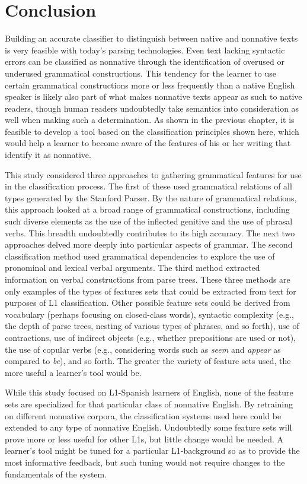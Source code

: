\documentclass[main.tex]{subfiles}
\begin{document}
\section{Conclusion}
\setcounter{section}{9}

Building an accurate classifier to distinguish between native and nonnative texts is very feasible with today's parsing technologies. Even text lacking syntactic errors can be classified as nonnative through the identification of overused or underused grammatical constructions. This tendency for the learner to use certain grammatical constructions more or less frequently than a native English speaker is likely also part of what makes nonnative texts appear as such to native readers, though human readers undoubtedly take semantics into consideration as well when making such a determination. As shown in the previous chapter, it is feasible to develop a tool based on the classification principles shown here, which would help a learner to become aware of the features of his or her writing that identify it as nonnative.

This study considered three approaches to gathering grammatical features for use in the classification process. The first of these used grammatical relations of all types generated by the Stanford Parser. By the nature of grammatical relations, this approach looked at a broad range of grammatical constructions, including such diverse elements as the use of the inflected genitive and the use of phrasal verbs. This breadth undoubtedly contributes to its high accuracy. The next two approaches delved more deeply into particular aspects of grammar. The second classification method used grammatical dependencies to explore the use of pronominal and lexical verbal arguments. The third method extracted information on verbal constructions from parse trees. These three methods are only examples of the types of features sets that could be extracted from text for purposes of L1 classification. Other possible feature sets could be derived from vocabulary (perhaps focusing on closed-class words), syntactic complexity (e.g., the depth of parse trees, nesting of various types of phrases, and so forth), use of contractions, use of indirect objects (e.g., whether prepositions are used or not), the use of copular verbs (e.g., considering words such as \textit{seem} and \textit{appear} as compared to \textit{be}), and so forth. The greater the variety of feature sets used, the more useful a learner's tool would be.

While this study focused on L1-Spanish learners of English, none of the feature sets are specialized for that particular class of nonnative English. By retraining on different nonnative corpora, the classification systems used here could be extended to any type of nonnative English. Undoubtedly some feature sets will prove more or less useful for other L1s, but little change would be needed. A learner's tool might be tuned for a particular L1-background so as to provide the most informative feedback, but such tuning would not require changes to the fundamentals of the system.
\end{document}
